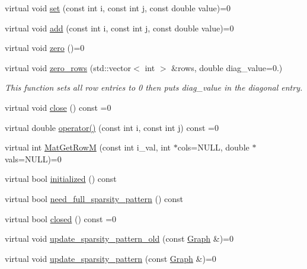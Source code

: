 \begin{DoxyCompactItemize}
virtual void \mbox{\hyperlink{classfemus_1_1_sparse_matrix_a63319c488a146297062c48daef79e1d1}{set}} (const int i, const int j, const double value)=0
\item 
virtual void \mbox{\hyperlink{classfemus_1_1_sparse_matrix_ac6a354954020514558320a17d881d861}{add}} (const int i, const int j, const double value)=0
\item 
virtual void \mbox{\hyperlink{classfemus_1_1_sparse_matrix_a45654dbe423d1970565b94c792ce6df3}{zero}} ()=0
\item 
virtual void \mbox{\hyperlink{classfemus_1_1_sparse_matrix_acc0c5bfc18542c904dc5590b2aa60148}{zero\+\_\+rows}} (std\+::vector$<$ int $>$ \&rows, double diag\+\_\+value=0.)
\begin{DoxyCompactList}\small\item\em This function sets all row entries to 0 then puts diag\+\_\+value in the diagonal entry. \end{DoxyCompactList}\item 
virtual void \mbox{\hyperlink{classfemus_1_1_sparse_matrix_a6eb9fbd88830b0d10c88f0ce066b07ae}{close}} () const =0
\item 
virtual double \mbox{\hyperlink{classfemus_1_1_sparse_matrix_af49d7891584d14cb064e7928de37427b}{operator()}} (const int i, const int j) const =0
\item 
virtual int \mbox{\hyperlink{classfemus_1_1_sparse_matrix_af8d51fbfb1005c3f057214cc727277b2}{Mat\+Get\+RowM}} (const int i\+\_\+val, int $\ast$cols=N\+U\+LL, double $\ast$vals=N\+U\+LL)=0
\item 
virtual bool \mbox{\hyperlink{classfemus_1_1_sparse_matrix_aba28205c5ba99d3d3475524af97a03f7}{initialized}} () const
\item 
virtual bool \mbox{\hyperlink{classfemus_1_1_sparse_matrix_a7c2b732bd898f199a4f4c28785e80a77}{need\+\_\+full\+\_\+sparsity\+\_\+pattern}} () const
\item 
virtual bool \mbox{\hyperlink{classfemus_1_1_sparse_matrix_a2f6f30b675a1afe8b78473c5f6ad59dc}{closed}} () const =0
\item 
virtual void \mbox{\hyperlink{classfemus_1_1_sparse_matrix_a01c357876b110078eb38201f7e600480}{update\+\_\+sparsity\+\_\+pattern\+\_\+old}} (const \mbox{\hyperlink{classfemus_1_1_graph}{Graph}} \&)=0
\item 
virtual void \mbox{\hyperlink{classfemus_1_1_sparse_matrix_a25ad4f8b8158fe1ed8c4c72b9943e27a}{update\+\_\+sparsity\+\_\+pattern}} (const \mbox{\hyperlink{classfemus_1_1_graph}{Graph}} \&)=0
\item 

\end{DoxyCompactItemize}
